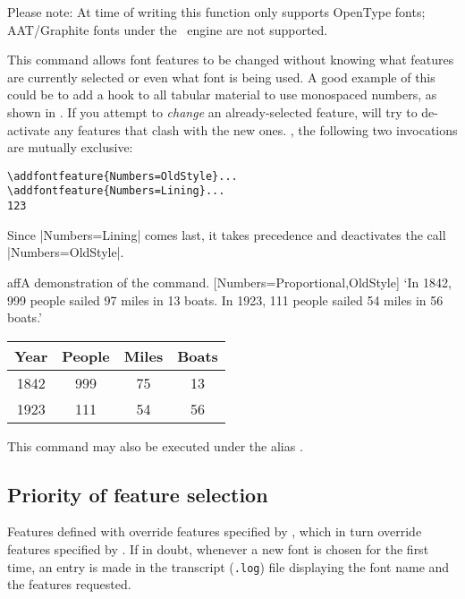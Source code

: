 Please note: At time of writing this function only supports OpenType fonts; AAT/Graphite fonts under the \XeTeX\ engine are not supported.



This command allows font features to
be changed without knowing what features are currently selected or even what
font is being used. A good example of this could be to add a hook to all
tabular material to use monospaced numbers, as shown in .
If you attempt to \emph{change} an already-selected feature,  will try to de-activate any features that clash with the new ones.
\Eg, the following two invocations are mutually exclusive:
\begin{Verbatim}
\addfontfeature{Numbers=OldStyle}...
\addfontfeature{Numbers=Lining}...
123
\end{Verbatim}
Since |Numbers=Lining| comes last, it takes precedence and deactivates the call |Numbers=OldStyle|.

\begin{Lexample}{aff}{A demonstration of the  command.}
           [Numbers={Proportional,OldStyle}]
  `In 1842, 999 people sailed 97 miles in
   13 boats. In 1923, 111 people sailed 54
   miles in 56 boats.'            \bigskip

  {
  \begin{tabular}{@{} cccc @{}}
            Year & People & Miles & Boats \\
    \hline  1842 &  999   &  75   &  13   \\
            1923 &  111   &  54   &  56
  \end{tabular}}
\end{Lexample}

\DescribeMacro{\addfontfeature}
This command may also be executed under the alias \cmd{\addfontfeature}.


\subsection{Priority of feature selection}
Features defined with  override features
specified by , which in turn override features
specified by .  If in doubt, whenever a
new font is chosen for the first time, an entry is made in the
transcript (\texttt{.log}) file displaying the font name and the
features requested.


